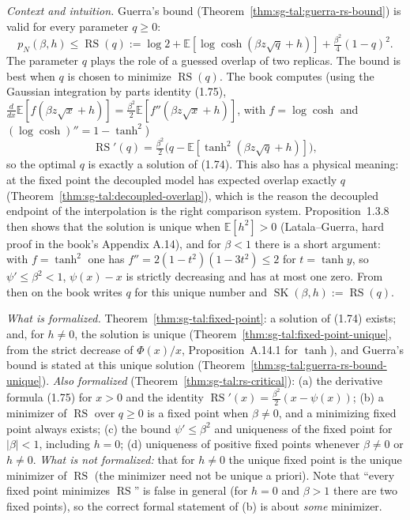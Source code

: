 \begin{remark}\label{rem:sg-tal:fixed-point-scope}
\emph{Context and intuition.} Guerra's bound (Theorem~\ref{thm:sg-tal:guerra-rs-bound}) is valid for every parameter $q\ge0$:
\[
p_N(\beta,h)\le \operatorname{RS}(q):=\log 2+\mathbb{E}[\log\cosh(\beta z\sqrt q+h)]+\tfrac{\beta^2}{4}(1-q)^2 .
\]
The parameter $q$ plays the role of a guessed overlap of two replicas. The bound is best when $q$ is chosen to minimize $\operatorname{RS}(q)$. The book computes (using the Gaussian integration by parts identity (1.75), $\frac{d}{dx}\mathbb{E}[f(\beta z\sqrt x+h)]=\frac{\beta^2}{2}\mathbb{E}[f''(\beta z\sqrt x+h)]$, with $f=\log\cosh$ and $(\log\cosh)''=1-\tanh^2$)
\[
\operatorname{RS}'(q)=\tfrac{\beta^2}{2}\big(q-\mathbb{E}[\tanh^2(\beta z\sqrt q+h)]\big),
\]
so the optimal $q$ is exactly a solution of (1.74). This also has a physical meaning: at the fixed point the decoupled model has expected overlap exactly $q$ (Theorem~\ref{thm:sg-tal:decoupled-overlap}), which is the reason the decoupled endpoint of the interpolation is the right comparison system. Proposition~1.3.8 then shows that the solution is unique when $\mathbb{E}[h^2]>0$ (Latala--Guerra, hard proof in the book's Appendix A.14), and for $\beta<1$ there is a short argument: with $f=\tanh^2$ one has $f''=2(1-t^2)(1-3t^2)\le2$ for $t=\tanh y$, so $\psi'\le\beta^2<1$, $\psi(x)-x$ is strictly decreasing and has at most one zero. From then on the book writes $q$ for this unique number and $\operatorname{SK}(\beta,h):=\operatorname{RS}(q)$.

\emph{What is formalized.} Theorem~\ref{thm:sg-tal:fixed-point}: a solution of (1.74) exists; and, for $h\ne0$, the solution is unique (Theorem~\ref{thm:sg-tal:fixed-point-unique}, from the strict decrease of $\Phi(x)/x$, Proposition~A.14.1 for $\tanh$), and Guerra's bound is stated at this unique solution (Theorem~\ref{thm:sg-tal:guerra-rs-bound-unique}). \emph{Also formalized} (Theorem~\ref{thm:sg-tal:rs-critical}): (a) the derivative formula (1.75) for $x>0$ and the identity $\operatorname{RS}'(x)=\frac{\beta^2}{2}(x-\psi(x))$; (b) a minimizer of $\operatorname{RS}$ over $q\ge0$ is a fixed point when $\beta\ne0$, and a minimizing fixed point always exists; (c) the bound $\psi'\le\beta^2$ and uniqueness of the fixed point for $|\beta|<1$, including $h=0$; (d) uniqueness of positive fixed points whenever $\beta\ne0$ or $h\ne0$. \emph{What is not formalized:} that for $h\ne0$ the unique fixed point is the unique minimizer of $\operatorname{RS}$ (the minimizer need not be unique a priori). Note that ``every fixed point minimizes $\operatorname{RS}$'' is false in general (for $h=0$ and $\beta>1$ there are two fixed points), so the correct formal statement of (b) is about \emph{some} minimizer.


\end{remark}
